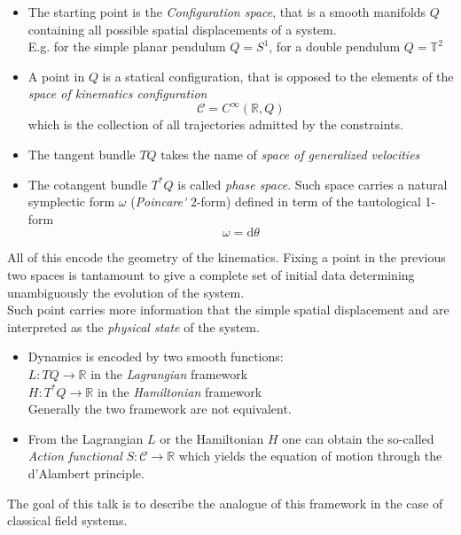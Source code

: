 \documentclass[a4paper,12pt,fleqn]{article}  %
\begin{document}
\begin{center}
\end{center}

\begin{itemize}
	\item The starting point is the \emph{Configuration space}, that is a smooth manifolds $Q$ containing all possible spatial displacements of a system.\\
	E.g. for the simple planar pendulum $Q= S^1$, for a double pendulum $Q =\mathbb{T}^2$
	\item A point in $Q$ is a statical configuration, that is opposed to the elements of the \emph{space of kinematics configuration}
	$$ \mathcal{C} = C^\infty(\mathbb{R},Q)$$
	which is the collection of all trajectories admitted by the constraints.
	\item The tangent bundle $TQ$ takes the name of \emph{space of generalized velocities}
	\item The cotangent bundle $T^\ast Q$ is called \emph{phase space}. Such space carries a natural symplectic form $\omega$ (\emph{Poincare\'} 2-form) defined in term of the tautological 1-form $$\omega= \text{d} \theta$$
\end{itemize}
%
All of this encode the geometry of the kinematics. Fixing a point in the previous two spaces is tantamount to give a complete set of initial data determining unambiguously the evolution of the system. 
\\
Such point carries more information that the simple spatial displacement and are interpreted as the \emph{physical state} of the system.
%
\begin{itemize}
\item Dynamics is encoded by two smooth functions:
	\\ 
	$L:TQ\rightarrow \mathbb{R}$ in the \emph{Lagrangian} framework
	\\
	$H:T^\ast Q \rightarrow \mathbb{R}$ in the \emph{Hamiltonian} framework
	\\
	Generally the two framework are not equivalent.
\item From the Lagrangian $L$ or the Hamiltonian $H$ one can obtain the so-called \emph{Action functional} $S:\mathcal{C}\rightarrow \mathbb{R}$ which yields the equation of motion through the d'Alambert principle.
\end{itemize}
%
The goal of this talk is to describe the analogue of this framework in the case of classical field systems.
\end{document}

